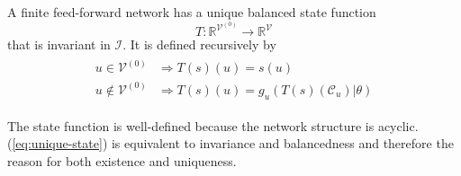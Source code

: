 \documentclass[a4paper,11pt]{article}
\begin{document}
\begin{Pro}
A finite feed-forward network has a unique balanced state function
\begin{equation}
T:\mathbb{R}^{\mathcal{V}^{(0)}}\to\mathbb{R}^{\mathcal{V}}
\end{equation}
that is invariant in $\mathcal{I}$. It is defined recursively by
\begin{align}\label{eq:unique-state}
\begin{split}
u\in\mathcal{V}^{(0)}&\Rightarrow T(s)(u)=s(u)\\
u\notin\mathcal{V}^{(0)}&\Rightarrow T(s)(u)=g_u\left(T(s)(\mathcal{C}_u)|\theta\right)
\end{split}
\end{align}
\end{Pro}
\begin{Bew}
The state function is well-defined because the network structure is acyclic. (\ref{eq:unique-state}) is equivalent to invariance and balancedness and therefore the reason for both existence and uniqueness.
\end{Bew}
\end{document}
